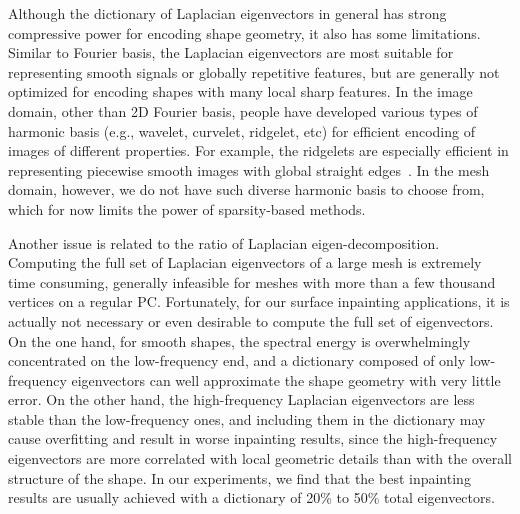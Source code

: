 Although the dictionary of Laplacian eigenvectors in general has strong
compressive power for encoding shape geometry, it also has some limitations.
Similar to Fourier basis, the Laplacian eigenvectors are most suitable for
representing smooth signals or globally repetitive features, but are generally
not optimized for encoding shapes with many local sharp features. In the image
domain, other than 2D Fourier basis, people have developed various types of
harmonic basis (e.g., wavelet, curvelet, ridgelet, etc) for efficient encoding
of images of different properties. For example, the ridgelets are especially
efficient in representing piecewise smooth images with global straight
edges~\cite{Fadili2012}. In the mesh domain, however, we do not have such
diverse harmonic basis to choose from, which for now limits the power of
sparsity-based methods.

Another issue is related to the ratio of Laplacian eigen-decomposition.
Computing the full set of Laplacian eigenvectors of a large mesh is
extremely time consuming, generally infeasible for meshes with more than a few
thousand vertices on a regular PC. Fortunately, for our surface inpainting
applications, it is actually not necessary or even desirable to compute the
full set of eigenvectors. On the one hand, for smooth shapes, the spectral
energy is overwhelmingly concentrated on the low-frequency end, and a
dictionary composed of only low-frequency eigenvectors can well approximate the
shape geometry with very little error. On the other hand, the high-frequency
Laplacian eigenvectors are less stable than the low-frequency ones, and
including them in the dictionary may cause overfitting and result in worse
inpainting results, since the high-frequency eigenvectors are more correlated
with local geometric details than with the overall structure of the shape. In
our experiments, we find that the best inpainting results are usually achieved
with a dictionary of 20\% to 50\% total eigenvectors.

